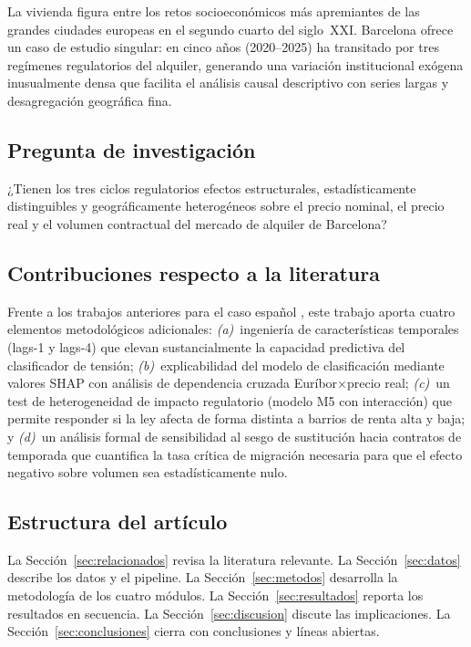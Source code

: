 \documentclass[10pt,a4paper,twocolumn]{article}
\begin{document}
La vivienda figura entre los retos socioeconómicos más apremiantes de las grandes
ciudades europeas en el segundo cuarto del siglo~XXI. Barcelona ofrece un caso de
estudio singular: en cinco años (2020--2025) ha transitado por tres regímenes
regulatorios del alquiler, generando una variación institucional exógena inusualmente
densa que facilita el análisis causal descriptivo con series largas y desagregación
geográfica fina.

\subsection*{Pregunta de investigación}

¿Tienen los tres ciclos regulatorios efectos estructurales, estadísticamente
distinguibles y geográficamente heterogéneos sobre el precio nominal, el precio real y
el volumen contractual del mercado de alquiler de Barcelona?

\subsection*{Contribuciones respecto a la literatura}

Frente a los trabajos anteriores para el caso español
\citep{garcia2018housing, bosch2021ley11}, este trabajo aporta cuatro elementos
metodológicos adicionales: \textit{(a)}~ingeniería de características temporales
(lags-1 y lags-4) que elevan sustancialmente la capacidad predictiva del clasificador
de tensión; \textit{(b)}~explicabilidad del modelo de clasificación mediante valores
SHAP con análisis de dependencia cruzada Euríbor$\times$precio real;
\textit{(c)}~un test de heterogeneidad de impacto regulatorio (modelo M5 con
interacción) que permite responder si la ley afecta de forma distinta a barrios de
renta alta y baja; y \textit{(d)}~un análisis formal de sensibilidad al sesgo de
sustitución hacia contratos de temporada que cuantifica la tasa crítica de migración
necesaria para que el efecto negativo sobre volumen sea estadísticamente nulo.

\subsection*{Estructura del artículo}

La Sección~\ref{sec:relacionados} revisa la literatura relevante.
La Sección~\ref{sec:datos} describe los datos y el pipeline.
La Sección~\ref{sec:metodos} desarrolla la metodología de los cuatro módulos.
La Sección~\ref{sec:resultados} reporta los resultados en secuencia.
La Sección~\ref{sec:discusion} discute las implicaciones.
La Sección~\ref{sec:conclusiones} cierra con conclusiones y líneas abiertas.
\end{document}
